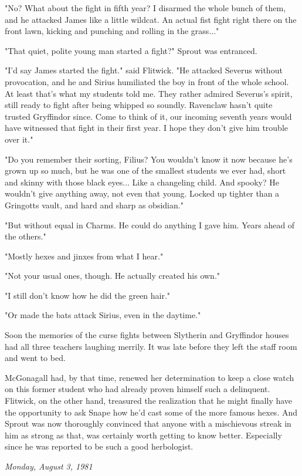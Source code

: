 \documentclass[a4paper,11pt]{article}
\begin{document}
"No? What about the fight in fifth year? I disarmed the whole bunch of them, and he attacked James like a little wildcat. An actual fist fight right there on the front lawn, kicking and punching and rolling in the grass..."

"That quiet, polite young man started a fight?" Sprout was entranced.

"I'd say James started the fight." said Flitwick. "He attacked Severus without provocation, and he and Sirius humiliated the boy in front of the whole school. At least that's what my students told me. They rather admired Severus's spirit, still ready to fight after being whipped so soundly. Ravenclaw hasn't quite trusted Gryffindor since. Come to think of it, our incoming seventh years would have witnessed that fight in their first year. I hope they don't give him trouble over it."

"Do you remember their sorting, Filius? You wouldn't know it now because he's grown up so much, but he was one of the smallest students we ever had, short and skinny with those black eyes... Like a changeling child. And spooky? He wouldn't give anything away, not even that young. Locked up tighter than a Gringotts vault, and hard and sharp as obsidian."

"But without equal in Charms. He could do anything I gave him. Years ahead of the others."

"Mostly hexes and jinxes from what I hear."

"Not your usual ones, though. He actually created his own."

"I still don't know how he did the green hair."

"Or made the bats attack Sirius, even in the daytime."

Soon the memories of the curse fights between Slytherin and Gryffindor houses had all three teachers laughing merrily. It was late before they left the staff room and went to bed.

McGonagall had, by that time, renewed her determination to keep a close watch on this former student who had already proven himself such a delinquent. Flitwick, on the other hand, treasured the realization that he might finally have the opportunity to ask Snape how he'd cast some of the more famous hexes. And Sprout was now thoroughly convinced that anyone with a mischievous streak in him as strong as that, was certainly worth getting to know better. Especially since he was reported to be such a good herbologist.

\emph{Monday, August 3, 1981}
\end{document}
